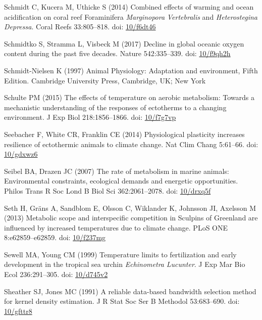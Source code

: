 \documentclass[a4paper,10pt, oneside]{memoir}
\begin{document}
\leavevmode\hypertarget{ref-Schmidt2014}{}%
Schmidt C, Kucera M, Uthicke S (2014) Combined effects of warming and ocean acidification on coral reef Foraminifera \emph{Marginopora} \emph{Vertebralis} and \emph{Heterostegina} \emph{Depressa}. Coral Reefs 33:805--818. doi: \href{https://doi.org/10/f6dt46}{10/f6dt46}

\leavevmode\hypertarget{ref-Schmidtko2017}{}%
Schmidtko S, Stramma L, Visbeck M (2017) Decline in global oceanic oxygen content during the past five decades. Nature 542:335--339. doi: \href{https://doi.org/10/f9qh2h}{10/f9qh2h}

\leavevmode\hypertarget{ref-Schmidt-Nielsen1997}{}%
Schmidt-Nielsen K (1997) Animal Physiology: Adaptation and environment, Fifth Edition. Cambridge University Press, Cambridge, UK; New York

\leavevmode\hypertarget{ref-Schulte2015}{}%
Schulte PM (2015) The effects of temperature on aerobic metabolism: Towards a mechanistic understanding of the responses of ectotherms to a changing environment. J Exp Biol 218:1856--1866. doi: \href{https://doi.org/10/f7g7vp}{10/f7g7vp}

\leavevmode\hypertarget{ref-Seebacher2014}{}%
Seebacher F, White CR, Franklin CE (2014) Physiological plasticity increases resilience of ectothermic animals to climate change. Nat Clim Chang 5:61--66. doi: \href{https://doi.org/10/gdxwz6}{10/gdxwz6}

\leavevmode\hypertarget{ref-Seibel2007}{}%
Seibel BA, Drazen JC (2007) The rate of metabolism in marine animals: Environmental constraints, ecological demands and energetic opportunities. Philos Trans R Soc Lond B Biol Sci 362:2061--2078. doi: \href{https://doi.org/10/drxq5f}{10/drxq5f}

\leavevmode\hypertarget{ref-Seth2013}{}%
Seth H, Gräns A, Sandblom E, Olsson C, Wiklander K, Johnsson JI, Axelsson M (2013) Metabolic scope and interspecific competition in Sculpins of Greenland are influenced by increased temperatures due to climate change. PLoS ONE 8:e62859--e62859. doi: \href{https://doi.org/10/f237mg}{10/f237mg}

\leavevmode\hypertarget{ref-Sewell1999}{}%
Sewell MA, Young CM (1999) Temperature limits to fertilization and early development in the tropical sea urchin \emph{Echinometra} \emph{Lucunter}. J Exp Mar Bio Ecol 236:291--305. doi: \href{https://doi.org/10/d745v2}{10/d745v2}

\leavevmode\hypertarget{ref-Sheather1991}{}%
Sheather SJ, Jones MC (1991) A reliable data-based bandwidth selection method for kernel density estimation. J R Stat Soc Ser B Methodol 53:683--690. doi: \href{https://doi.org/10/gfttr8}{10/gfttr8}
\end{document}

